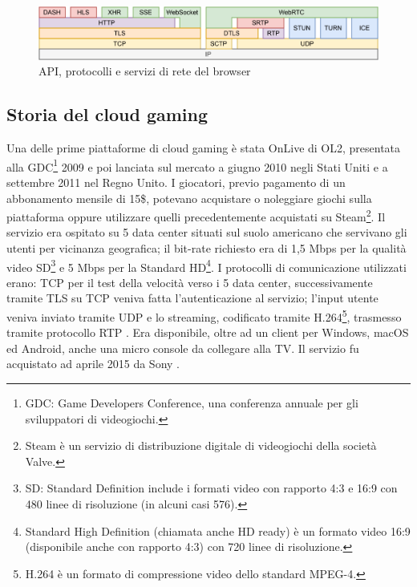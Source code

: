 \begin{figure}[H]
	\includegraphics[width=\linewidth]{immagini/webprotocols}
	\caption{API, protocolli e servizi di rete del browser}
	\label{fig:webprotocols}
\end{figure}





\subsection{Storia del cloud gaming} \label{StoriaDelCloudGaming}
Una delle prime piattaforme di cloud gaming è stata OnLive di OL2, presentata alla GDC\footnote{GDC: Game Developers Conference, una conferenza annuale per gli sviluppatori di videogiochi.} 2009 e poi lanciata sul mercato a giugno 2010 negli Stati Uniti e a settembre 2011 nel Regno Unito. I giocatori, previo pagamento di un abbonamento mensile di 15\$, potevano acquistare o noleggiare giochi sulla piattaforma oppure utilizzare quelli precedentemente acquistati su Steam\footnote{Steam è un servizio di distribuzione digitale di videogiochi della società Valve.}. Il servizio era ospitato su 5 data center situati sul suolo americano che servivano gli utenti per vicinanza geografica; il bit-rate richiesto era di 1,5 Mbps per la qualità video SD\footnote{SD: Standard Definition include i formati video con rapporto 4:3 e 16:9 con 480 linee di risoluzione (in alcuni casi 576).} e 5 Mbps per la Standard HD\footnote{Standard High Definition (chiamata anche HD ready) è un formato video 16:9 (disponibile anche con rapporto 4:3) con 720 linee di risoluzione.}. I protocolli di comunicazione utilizzati erano: TCP per il test della velocità verso i 5 data center, successivamente tramite TLS su TCP veniva fatta l'autenticazione al servizio; l'input utente veniva inviato tramite UDP e lo streaming, codificato tramite H.264\footnote{H.264 è un formato di compressione video dello standard MPEG-4.}, trasmesso tramite protocollo RTP \parencite{Dissecting_the_protocol_and_network_traffic_of_the_OnLive_cloud_gaming_platform}. Era disponibile, oltre ad un client per Windows, macOS ed Android, anche una micro console da collegare alla TV. Il servizio fu acquistato ad aprile 2015 da Sony \parencite{Cloud_gaming_history}.


